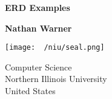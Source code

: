 \documentclass{report}
\title{\Huge{}}
\author{\huge{Nathan Warner}}
\date{\huge{}}
\begin{document}
        \begin{titlepage}
       \begin{center}
           \vspace*{1cm}
    
           \textbf{ERD Examples}
    
           \vspace{0.5cm}
            
                
           \vspace{1.5cm}
    
           \textbf{Nathan Warner}
    
           \vfill
                
                
           \vspace{0.8cm}
         
           \texttt{[image: ~/niu/seal.png]}
                
           Computer Science \\
           Northern Illinois University\\
           United States\\
           
                
       \end{center}
    \end{titlepage}
    \tableofcontents
    \pagebreak 
    \bigbreak \noindent 
\end{document}
